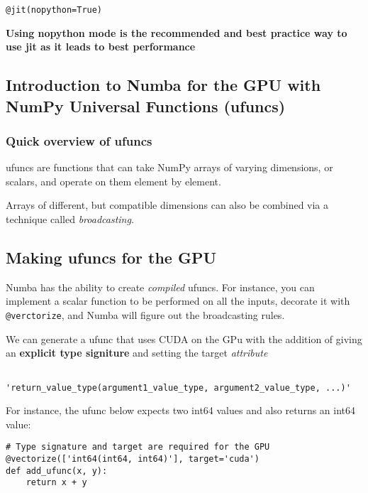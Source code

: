\documentclass{article}
\begin{document}
\begin{verbatim}
@jit(nopython=True)
\end{verbatim}

\textbf{Using nopython mode is the recommended and best practice way to use jit as it leads to best performance}

\subsection{Introduction to Numba for the GPU with NumPy Universal Functions (ufuncs)}
\subsubsection{Quick overview of ufuncs}
ufuncs are functions that can take NumPy arrays of varying dimensions, or scalars, and operate on them element by element.

Arrays of different, but compatible dimensions can also be combined via a technique called \textit{broadcasting}.

\subsection{Making ufuncs for the GPU}
Numba has the ability to create \textit{compiled} ufuncs. For instance, you can implement a scalar function to be performed on all the inputs, decorate it with \verb_@verctorize_, and Numba will figure out the broadcasting rules. 

We can generate a ufunc that uses CUDA on the GPu with the addition of giving an \textbf{explicit type signiture} and setting the target \textit{attribute}

\begin{verbatim}

'return_value_type(argument1_value_type, argument2_value_type, ...)'

\end{verbatim}

For instance, the ufunc below expects two int64 values and also returns an int64 value:

\begin{verbatim}
# Type signature and target are required for the GPU
@vectorize(['int64(int64, int64)'], target='cuda') 
def add_ufunc(x, y):
    return x + y
\end{verbatim}
\end{document}
